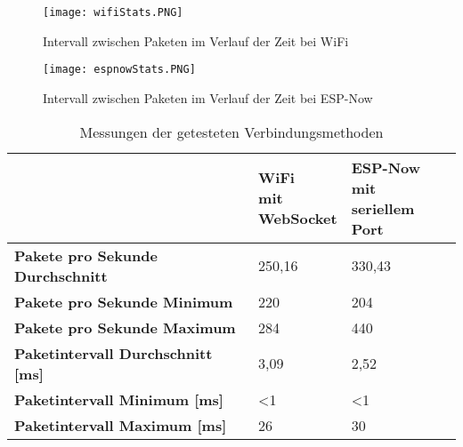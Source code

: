\begin{figure}[h]
    \centering
    \texttt{[image: wifiStats.PNG]}
    \caption{Intervall zwischen Paketen im Verlauf der Zeit bei WiFi}
    \label{fig:wifiStats}
\end{figure}
\begin{figure}[h]
    \centering
    \texttt{[image: espnowStats.PNG]}
    \caption{Intervall zwischen Paketen im Verlauf der Zeit bei ESP-Now}
    \label{fig:espnowStats}
\end{figure}

\begin{table}[h]
    \centering
    \begin{threeparttable}
        \caption{Messungen der getesteten Verbindungsmethoden}
        \begin{tabular}{|l|l|l|}
            \hline
            ~                                                                 & \parbox[c][1.5cm]{2cm}{\textbf{WiFi          \\mit\\WebSocket}} & \parbox[c][1.5cm]{2.5cm}{\textbf{ESP-Now\\mit\\seriellem Port}} \\ \hline
            \parbox[c][0.5cm]{6cm}{\textbf{Pakete pro Sekunde Durchschnitt} } & 250,16                              & 330,43 \\ \hline
            \parbox[c][0.5cm]{6cm}{\textbf{Pakete pro Sekunde Minimum}      } & 220                                 & 204    \\ \hline
            \parbox[c][0.5cm]{6cm}{\textbf{Pakete pro Sekunde Maximum}      } & 284                                 & 440    \\ \hline
            \parbox[c][0.5cm]{6cm}{\textbf{Paketintervall Durchschnitt [ms]}} & 3,09                                & 2,52   \\ \hline
            \parbox[c][0.5cm]{6cm}{\textbf{Paketintervall Minimum [ms]}     } & <1                                  & <1     \\ \hline
            \parbox[c][0.5cm]{6cm}{\textbf{Paketintervall Maximum [ms]}     } & 26                                  & 30     \\ \hline
        \end{tabular}
        \label{tab:connectionStats}
    \end{threeparttable}
\end{table}

